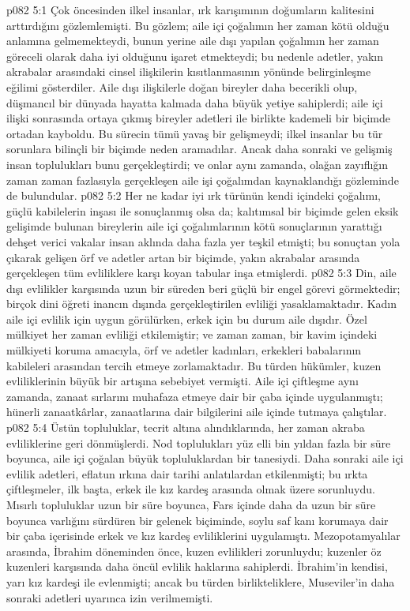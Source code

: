 \vs p082 5:1 Çok öncesinden ilkel insanlar, ırk karışımının doğumların kalitesini arttırdığını gözlemlemişti. Bu gözlem; aile içi çoğalımın her zaman kötü olduğu anlamına gelmemekteydi, bunun yerine aile dışı yapılan çoğalımın her zaman göreceli olarak daha iyi olduğunu işaret etmekteydi; bu nedenle adetler, yakın akrabalar arasındaki cinsel ilişkilerin kısıtlanmasının yönünde belirginleşme eğilimi gösterdiler. Aile dışı ilişkilerle doğan bireyler daha becerikli olup, düşmancıl bir dünyada hayatta kalmada daha büyük yetiye sahiplerdi; aile içi ilişki sonrasında ortaya çıkmış bireyler adetleri ile birlikte kademeli bir biçimde ortadan kayboldu. Bu sürecin tümü yavaş bir gelişmeydi; ilkel insanlar bu tür sorunlara bilinçli bir biçimde neden aramadılar. Ancak daha sonraki ve gelişmiş insan toplulukları bunu gerçekleştirdi; ve onlar aynı zamanda, olağan zayıflığın zaman zaman fazlasıyla gerçekleşen aile işi çoğalımdan kaynaklandığı gözleminde de bulundular.
\vs p082 5:2 Her ne kadar iyi ırk türünün kendi içindeki çoğalımı, güçlü kabilelerin inşası ile sonuçlanmış olsa da; kalıtımsal bir biçimde gelen eksik gelişimde bulunan bireylerin aile içi çoğalımlarının kötü sonuçlarının yarattığı dehşet verici vakalar insan aklında daha fazla yer teşkil etmişti; bu sonuçtan yola çıkarak gelişen örf ve adetler artan bir biçimde, yakın akrabalar arasında gerçekleşen tüm evliliklere karşı koyan tabular inşa etmişlerdi.
\vs p082 5:3 Din, aile dışı evlilikler karşısında uzun bir süreden beri güçlü bir engel görevi görmektedir; birçok dini öğreti inancın dışında gerçekleştirilen evliliği yasaklamaktadır. Kadın aile içi evlilik için uygun görülürken, erkek için bu durum aile dışıdır. Özel mülkiyet her zaman evliliği etkilemiştir; ve zaman zaman, bir kavim içindeki mülkiyeti koruma amacıyla, örf ve adetler kadınları, erkekleri babalarının kabileleri arasından tercih etmeye zorlamaktadır. Bu türden hükümler, kuzen evliliklerinin büyük bir artışına sebebiyet vermişti. Aile içi çiftleşme aynı zamanda, zanaat sırlarını muhafaza etmeye dair bir çaba içinde uygulanmıştı; hünerli zanaatkârlar, zanaatlarına dair bilgilerini aile içinde tutmaya çalıştılar.
\vs p082 5:4 Üstün topluluklar, tecrit altına alındıklarında, her zaman akraba evliliklerine geri dönmüşlerdi. Nod toplulukları yüz elli bin yıldan fazla bir süre boyunca, aile içi çoğalan büyük topluluklardan bir tanesiydi. Daha sonraki aile içi evlilik adetleri, eflatun ırkına dair tarihi anlatılardan etkilenmişti; bu ırkta çiftleşmeler, ilk başta, erkek ile kız kardeş arasında olmak üzere sorunluydu. Mısırlı topluluklar uzun bir süre boyunca, Fars içinde daha da uzun bir süre boyunca varlığını sürdüren bir gelenek biçiminde, soylu saf kanı korumaya dair bir çaba içerisinde erkek ve kız kardeş evliliklerini uygulamıştı. Mezopotamyalılar arasında, İbrahim döneminden önce, kuzen evlilikleri zorunluydu; kuzenler öz kuzenleri karşısında daha öncül evlilik haklarına sahiplerdi. İbrahim’in kendisi, yarı kız kardeşi ile evlenmişti; ancak bu türden birlikteliklere, Museviler’in daha sonraki adetleri uyarınca izin verilmemişti.
